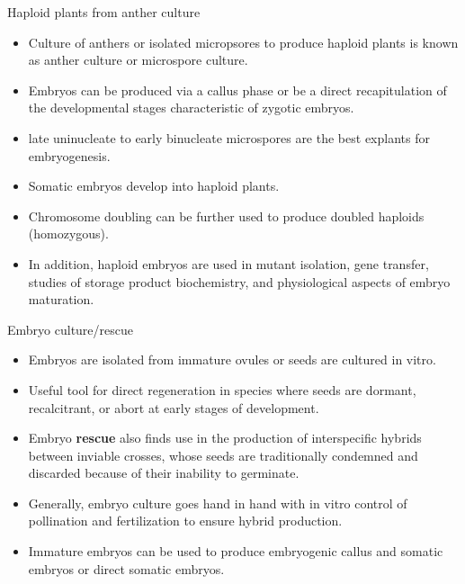 \documentclass[ignorenonframetext,aspectratio=169]{beamer}
\providecommand{\tightlist}{%
  \setlength{\itemsep}{0pt}\setlength{\parskip}{0pt}}
\begin{document}
\begin{frame}{Haploid plants from anther culture}
\protect\hypertarget{haploid-plants-from-anther-culture}{}

\begin{itemize}
\tightlist
\item
  Culture of anthers or isolated micropsores to produce haploid plants
  is known as anther culture or microspore culture.
\item
  Embryos can be produced via a callus phase or be a direct
  recapitulation of the developmental stages characteristic of zygotic
  embryos.
\item
  late uninucleate to early binucleate microspores are the best explants
  for embryogenesis.
\item
  Somatic embryos develop into haploid plants.
\item
  Chromosome doubling can be further used to produce doubled haploids
  (homozygous).
\item
  In addition, haploid embryos are used in mutant isolation, gene
  transfer, studies of storage product biochemistry, and physiological
  aspects of embryo maturation.
\end{itemize}

\end{frame}

\begin{frame}{Embryo culture/rescue}
\protect\hypertarget{embryo-culturerescue}{}

\begin{itemize}
\tightlist
\item
  Embryos are isolated from immature ovules or seeds are cultured in
  vitro.
\item
  Useful tool for direct regeneration in species where seeds are
  dormant, recalcitrant, or abort at early stages of development.
\item
  Embryo \textbf{rescue} also finds use in the production of
  interspecific hybrids between inviable crosses, whose seeds are
  traditionally condemned and discarded because of their inability to
  germinate.
\item
  Generally, embryo culture goes hand in hand with in vitro control of
  pollination and fertilization to ensure hybrid production.
\item
  Immature embryos can be used to produce embryogenic callus and somatic
  embryos or direct somatic embryos.
\end{itemize}

\end{frame}
\end{document}

